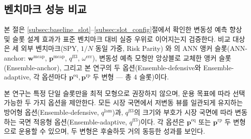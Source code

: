 \documentclass[eng]{kjas3}
\begin{document}
\subsection{벤치마크 성능 비교}\label{subsec:benchmark}

본 절은 \ref{subsec:baseline_slot}--\ref{subsec:slot_config}절에서 확인한 변동성 예측 향상 및 슬롯 설계 효과가 표준 벤치마크 대비 실증 우위로 이어지는지 검증한다. 비교 대상은 세 외부 벤치마크(SPY, $1/N$ 동일 가중, Risk Parity) 와 \citet{pyo2018}의 ANN 앵커 슬롯(ANN-anchor: $\mathbf{w}^{\mathrm{mcap}}$, $\mathbf{p}^{\mathrm{mcap}}$, $q^{\mathrm{ff3}}$, $\omega^{\mathrm{err}}$), 변동성 예측 모형만 앙상블로 교체한 앵커 슬롯(Ensemble-anchor), 그리고 본 연구의 두 옵션(Ensemble-defensive와 Ensemble-adaptive, 각 옵션마다 $\mathbf{p}^{\mathrm{eq}}, \mathbf{p}^{\mathrm{rp}}$ 두 변형 — 총 4 슬롯)이다.

본 연구는 특정 단일 슬롯만을 최적 모형으로 권장하지 않으며, 운용 목표에 따라 선택 가능한 두 가지 옵션을 제안한다. 모든 시장 국면에서 저변동 뷰를 일관되게 유지하는 방어형 옵션(Ensemble-defensive, $q^{\mathrm{lam}}$)과, $q^{\mathrm{ff3}}$의 크기와 부호가 시장 국면에 따라 변동하는 국면 적응형 옵션(Ensemble-adaptive, $q^{\mathrm{ff3}}$)이다. 각 옵션은 $\mathbf{p}^{\mathrm{eq}}$ 또는 $\mathbf{p}^{\mathrm{rp}}$ 두 변형으로 운용할 수 있으며, 두 변형은 후술하듯 거의 동등한 성과를 보인다.
\end{document}
